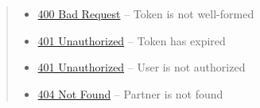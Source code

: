 \documentclass[letterpaper,10pt,english]{sphinxmanual}
\begin{document}
\begin{fulllineitems}
\begin{quote}
\begin{description}
\begin{itemize}
\item {} 
\href{http://www.w3.org/Protocols/rfc2616/rfc2616-sec10.html\#sec10.4.1}{400 Bad Request} -- Token is not well-formed

\item {} 
\href{http://www.w3.org/Protocols/rfc2616/rfc2616-sec10.html\#sec10.4.2}{401 Unauthorized} -- Token has expired

\item {} 
\href{http://www.w3.org/Protocols/rfc2616/rfc2616-sec10.html\#sec10.4.2}{401 Unauthorized} -- User is not authorized

\item {} 
\href{http://www.w3.org/Protocols/rfc2616/rfc2616-sec10.html\#sec10.4.5}{404 Not Found} -- Partner is not found

\end{itemize}

\end{description}\end{quote}

\end{fulllineitems}
\end{document}
